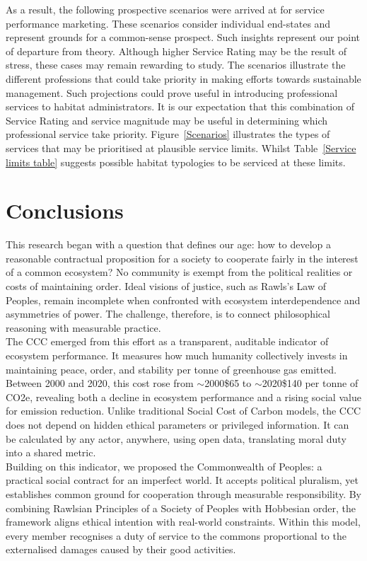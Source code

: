 As a result, the following prospective scenarios were arrived at for service performance marketing.
These scenarios consider individual end-states and represent grounds for a common-sense prospect.
Such insights represent our point of departure from theory.
Although higher Service Rating may be the result of stress, these cases may remain rewarding to study.
The scenarios illustrate the different professions that could take priority in making efforts towards sustainable management.
Such projections could prove useful in introducing professional services to habitat administrators.
It is our expectation that this combination of Service Rating and service magnitude may be useful in determining which professional service take priority.
Figure~\ref{Scenarios} illustrates the types of services that may be prioritised at plausible service limits.
Whilst Table~\ref{Service limits table} suggests possible habitat typologies to be serviced at these limits.\\

\section{Conclusions}

This research began with a question that defines our age: how to develop a reasonable contractual proposition for a society to cooperate fairly in the interest of a common ecosystem?
No community is exempt from the political realities or costs of maintaining order.
Ideal visions of justice, such as Rawls’s Law of Peoples, remain incomplete when confronted with ecosystem interdependence and asymmetries of power.
The challenge, therefore, is to connect philosophical reasoning with measurable practice.\\

The CCC emerged from this effort as a transparent, auditable indicator of ecosystem performance.
It measures how much humanity collectively invests in maintaining peace, order, and stability per tonne of greenhouse gas emitted.
Between 2000 and 2020, this cost rose from $\sim$2000\$65 to $\sim$2020\$140 per tonne of CO2e, revealing both a decline in ecosystem performance and a rising social value for emission reduction.
Unlike traditional Social Cost of Carbon models, the CCC does not depend on hidden ethical parameters or privileged information.
It can be calculated by any actor, anywhere, using open data, translating moral duty into a shared metric.\\

Building on this indicator, we proposed the Commonwealth of Peoples: a practical social contract for an imperfect world.
It accepts political pluralism, yet establishes common ground for cooperation through measurable responsibility.
By combining Rawlsian Principles of a Society of Peoples with Hobbesian order, the framework aligns ethical intention with real-world constraints.
Within this model, every member recognises a duty of service to the commons proportional to the externalised damages caused by their good activities.\\

